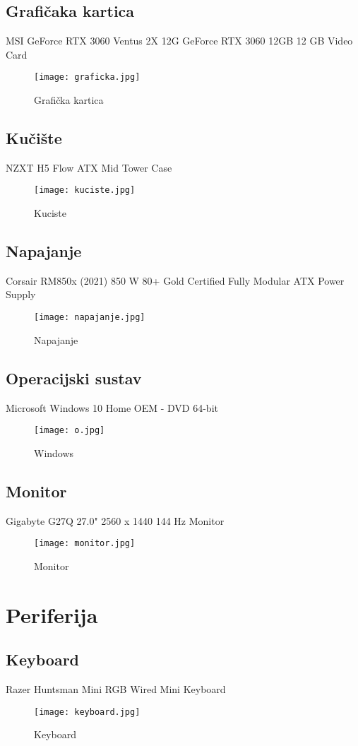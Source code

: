 \documentclass{report}
\begin{document}
\section{Grafičaka kartica}
MSI GeForce RTX 3060 Ventus 2X 12G GeForce RTX 3060 12GB 12 GB Video Card
\begin{figure}[h]
    \texttt{[image: graficka.jpg]}
    \caption{Grafička kartica}
\end{figure}

\section{Kučište}
NZXT H5 Flow ATX Mid Tower Case
\begin{figure}[h]
    \texttt{[image: kuciste.jpg]}
    \caption{Kuciste}
\end{figure}

\section{Napajanje}
Corsair RM850x (2021) 850 W 80+ Gold Certified Fully Modular ATX Power Supply
\begin{figure}[h]
    \texttt{[image: napajanje.jpg]}
    \caption{Napajanje}
\end{figure}

\section{Operacijski sustav}
Microsoft Windows 10 Home OEM - DVD 64-bit
\begin{figure}[h]
    \texttt{[image: o.jpg]}
    \caption{Windows}
\end{figure}

\section{Monitor}
Gigabyte G27Q 27.0" 2560 x 1440 144 Hz Monitor
\begin{figure}[h]
    \texttt{[image: monitor.jpg]}
    \caption{Monitor}
\end{figure}

\chapter{Periferija}

\section{Keyboard}
Razer Huntsman Mini RGB Wired Mini Keyboard
\begin{figure}[h]
    \texttt{[image: keyboard.jpg]}
    \caption{Keyboard}
\end{figure}
\end{document}

